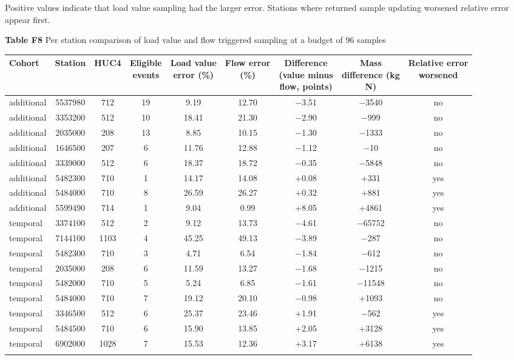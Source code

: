 \documentclass[lineno,pdflatex,sn-apa]{sn-jnl}%
\theoremstyle{thmstyleone}%
\theoremstyle{thmstyletwo}%
\theoremstyle{thmstylethree}%
\begin{document}
Positive values indicate that load value sampling had the larger error. Stations where returned sample updating worsened relative error appear first.

\begin{center}
\noindent\textbf{Table F8} Per station comparison of load value and flow triggered sampling at a budget of 96 samples
\end{center}

\begin{center}
\footnotesize
\setlength{\tabcolsep}{2pt}
\begin{tabular}{@{}lcccccccc@{}}
\toprule
Cohort & Station & HUC4 & \shortstack{Eligible\\events} & \shortstack{Load value\\error (\%)} & \shortstack{Flow error\\(\%)} & \shortstack{Difference\\(value minus\\flow, points)} & \shortstack{Mass\\difference (kg\\N)} & \shortstack{Relative error\\worsened}\\
\midrule
additional & 5537980 & 712 & 19 & 9.19 & 12.70 & $-$3.51 & $-$3540 & no\\
additional & 3353200 & 512 & 10 & 18.41 & 21.30 & $-$2.90 & $-$999 & no\\
additional & 2035000 & 208 & 13 & 8.85 & 10.15 & $-$1.30 & $-$1333 & no\\
additional & 1646500 & 207 & 6 & 11.76 & 12.88 & $-$1.12 & $-$10 & no\\
additional & 3339000 & 512 & 6 & 18.37 & 18.72 & $-$0.35 & $-$5848 & no\\
additional & 5482300 & 710 & 1 & 14.17 & 14.08 & +0.08 & +331 & yes\\
additional & 5484000 & 710 & 8 & 26.59 & 26.27 & +0.32 & +881 & yes\\
additional & 5599490 & 714 & 1 & 9.04 & 0.99 & +8.05 & +4861 & yes\\
temporal & 3374100 & 512 & 2 & 9.12 & 13.73 & $-$4.61 & $-$65752 & no\\
temporal & 7144100 & 1103 & 4 & 45.25 & 49.13 & $-$3.89 & $-$287 & no\\
temporal & 5482300 & 710 & 3 & 4.71 & 6.54 & $-$1.84 & $-$612 & no\\
temporal & 2035000 & 208 & 6 & 11.59 & 13.27 & $-$1.68 & $-$1215 & no\\
temporal & 5482000 & 710 & 5 & 5.24 & 6.85 & $-$1.61 & $-$11548 & no\\
temporal & 5484000 & 710 & 7 & 19.12 & 20.10 & $-$0.98 & +1093 & no\\
temporal & 3346500 & 512 & 6 & 25.37 & 23.46 & +1.91 & $-$562 & yes\\
temporal & 5484500 & 710 & 6 & 15.90 & 13.85 & +2.05 & +3128 & yes\\
temporal & 6902000 & 1028 & 7 & 15.53 & 12.36 & +3.17 & +6138 & yes\\
\botrule
\end{tabular}
\end{center}
\end{document}
